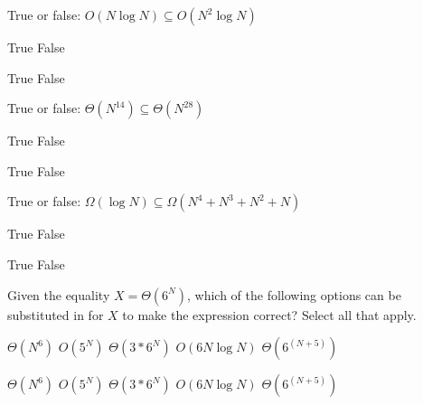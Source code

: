 \question True or false: $O(N \log N) \subseteq O(N^2 \log N)$

\ifprintanswers\else
\begin{oneparcheckboxes}
\choice True
\choice False
\end{oneparcheckboxes}
\fi

\begin{solution}
\begin{oneparcheckboxes}
\CorrectChoice True
\choice False
\end{oneparcheckboxes}
\end{solution}

\question True or false: $\Theta(N^{14}) \subseteq \Theta(N^{28})$

\ifprintanswers\else
\begin{oneparcheckboxes}
\choice True
\choice False
\end{oneparcheckboxes}
\fi

\begin{solution}
\begin{oneparcheckboxes}
\choice True
\CorrectChoice False
\end{oneparcheckboxes}
\end{solution}

\question True or false: $\Omega(\log N) \subseteq \Omega(N^4 + N^3 + N^2 + N)$

\ifprintanswers\else
\begin{oneparcheckboxes}
\choice True
\choice False
\end{oneparcheckboxes}
\fi

\begin{solution}
\begin{oneparcheckboxes}
\choice True
\CorrectChoice False
\end{oneparcheckboxes}
\end{solution}

\question Given the equality $X = \Theta(6^N)$, which of the following options can be substituted in for $X$ to make the expression correct? Select all that apply.

\checkboxchar{$\Box$}

\ifprintanswers\else
\begin{oneparcheckboxes}
\choice $\Theta(N^6)$
\choice $O(5^N)$
\choice $\Theta(3 * 6^N)$
\choice $O(6N \log N)$
\choice $\Theta(6^{(N + 5)})$
\end{oneparcheckboxes}
\fi

\begin{solution}
\begin{oneparcheckboxes}
\choice $\Theta(N^6)$
\choice $O(5^N)$
\CorrectChoice $\Theta(3 * 6^N)$
\choice $O(6N \log N)$
\CorrectChoice $\Theta(6^{(N + 5)})$
\end{oneparcheckboxes}
\end{solution}
